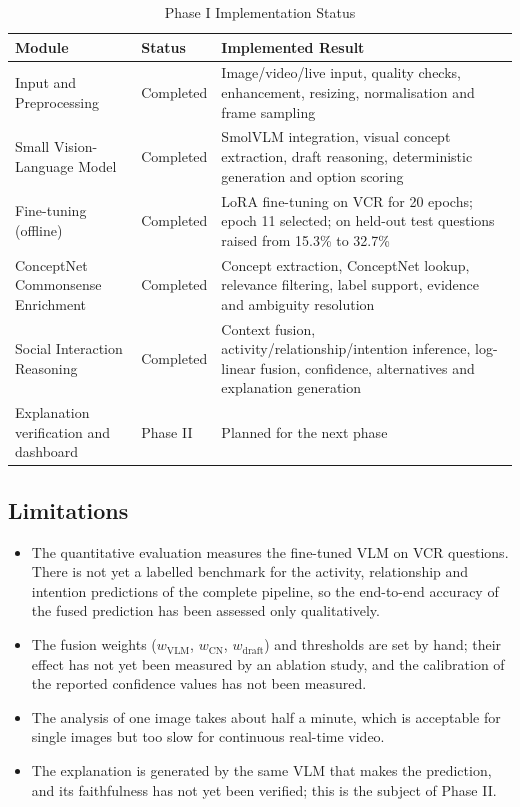 \begin{table}[h!]
\centering
\caption{Phase I Implementation Status}
\label{tab:status}
\small
\renewcommand{\arraystretch}{1.3}
\begin{tabularx}{\textwidth}{|p{4cm}|p{2.2cm}|L|}
\hline
\textbf{Module} & \textbf{Status} & \textbf{Implemented Result}\\ \hline
Input and Preprocessing & Completed & Image/video/live input, quality checks, enhancement, resizing, normalisation and frame sampling\\ \hline
Small Vision-Language Model & Completed & SmolVLM integration, visual concept extraction, draft reasoning, deterministic generation and option scoring\\ \hline
Fine-tuning (offline) & Completed & LoRA fine-tuning on VCR for 20 epochs; epoch 11 selected; \QtoAR{} on held-out test questions raised from 15.3\% to 32.7\%\\ \hline
ConceptNet Commonsense Enrichment & Completed & Concept extraction, ConceptNet lookup, relevance filtering, label support, evidence and ambiguity resolution\\ \hline
Social Interaction Reasoning & Completed & Context fusion, activity/relationship/intention inference, log-linear fusion, confidence, alternatives and explanation generation\\ \hline
Explanation verification and dashboard & Phase II & Planned for the next phase\\ \hline
\end{tabularx}
\end{table}

\subsection{Limitations}
\begin{itemize}
\item The quantitative evaluation measures the fine-tuned VLM on VCR questions. There is not yet a labelled benchmark for the activity, relationship and intention predictions of the complete pipeline, so the end-to-end accuracy of the fused prediction has been assessed only qualitatively.
\item The fusion weights ($w_{\text{VLM}}$, $w_{\text{CN}}$, $w_{\text{draft}}$) and thresholds are set by hand; their effect has not yet been measured by an ablation study, and the calibration of the reported confidence values has not been measured.
\item The analysis of one image takes about half a minute, which is acceptable for single images but too slow for continuous real-time video.
\item The explanation is generated by the same VLM that makes the prediction, and its faithfulness has not yet been verified; this is the subject of Phase II.
\end{itemize}
